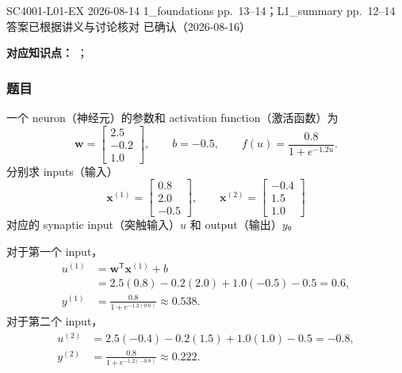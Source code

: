 

\examplemeta
  {SC4001-L01-EX}
  {2026-08-14}
  {1\_foundations pp.~13--14；L1\_summary pp.~12--14}
  {答案已根据讲义与讨论核对}
  {已确认（2026-08-16）}


\textbf{对应知识点：}
；

\subsubsection*{题目}

一个 neuron（神经元）的参数和 activation function（激活函数）为
\[
  \bm w=
  \begin{bmatrix}2.5\\-0.2\\1.0\end{bmatrix},
  \qquad b=-0.5,
  \qquad f(u)=\frac{0.8}{1+e^{-1.2u}}.
\]
分别求 inputs（输入）
\[
  \bm x^{(1)}=
  \begin{bmatrix}0.8\\2.0\\-0.5\end{bmatrix},
  \qquad
  \bm x^{(2)}=
  \begin{bmatrix}-0.4\\1.5\\1.0\end{bmatrix}
\]
对应的 synaptic input（突触输入）$u$ 和 output（输出）$y$。

\begin{checkedsolution}
对于第一个 input，
\begin{align*}
  u^{(1)}
    &=\bm w^{\mathsf T}\bm x^{(1)}+b \\
    &=2.5(0.8)-0.2(2.0)+1.0(-0.5)-0.5=0.6,\\
  y^{(1)}
    &=\frac{0.8}{1+e^{-1.2(0.6)}}\approx0.538.
\end{align*}
对于第二个 input，
\begin{align*}
  u^{(2)}
    &=2.5(-0.4)-0.2(1.5)+1.0(1.0)-0.5=-0.8,\\
  y^{(2)}
    &=\frac{0.8}{1+e^{-1.2(-0.8)}}\approx0.222.
\end{align*}
\end{checkedsolution}


